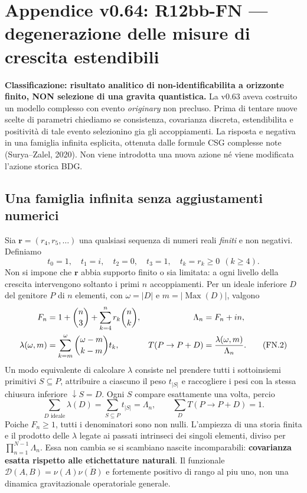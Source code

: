 \documentclass[11pt,a4paper]{article}
\begin{document}
\clearpage
\section*{Appendice v0.64: R12bb-FN --- degenerazione delle misure di crescita estendibili}
\label{sec:r12bbfn}
\textbf{Classificazione: risultato analitico di non-identificabilita a orizzonte finito, NON selezione di una gravita quantistica.}
La v0.63 aveva costruito un modello complesso con evento \emph{originary} non precluso. Prima di tentare nuove scelte di parametri chiediamo se consistenza, covarianza discreta, estendibilita e positività di tale evento selezionino gia gli accoppiamenti. La risposta e negativa in una famiglia infinita esplicita, ottenuta dalle formule CSG complesse note (Surya--Zalel, 2020). Non viene introdotta una nuova azione né viene modificata l'azione storica BDG.

\subsection*{Una famiglia infinita senza aggiustamenti numerici}
Sia $\boldsymbol r=(r_4,r_5,\ldots)$ una qualsiasi sequenza di numeri reali \emph{finiti} e non negativi. Definiamo
\begin{equation}
\boxed{t_0=1,\quad t_1=i,\quad t_2=0,\quad t_3=1,\quad t_k=r_k\ge0\ \ (k\ge4).}\tag{FN.1}
\end{equation}
Non si impone che $\boldsymbol r$ abbia supporto finito o sia limitata: a ogni livello della crescita intervengono soltanto i primi $n$ accoppiamenti. Per un ideale inferiore $D$ del genitore $P$ di $n$ elementi, con $\omega=|D|$ e $m=|\operatorname{Max}(D)|$, valgono
\begin{align}
F_n&=1+\binom n3+\sum_{k=4}^{n}r_k\binom nk, &\Lambda_n&=F_n+in,\notag\\
\lambda(\omega,m)&=\sum_{k=m}^{\omega}\binom{\omega-m}{k-m}t_k,
&T(P\to P+D)&=\frac{\lambda(\omega,m)}{\Lambda_n}.\tag{FN.2}
\end{align}
Un modo equivalente di calcolare $\lambda$ consiste nel prendere tutti i sottoinsiemi primitivi $S\subseteq P$, attribuire a ciascuno il peso $t_{|S|}$ e raccogliere i pesi con la stessa chiusura inferiore $\downarrow S=D$. Ogni $S$ compare esattamente una volta, percio
\begin{equation}
\boxed{\sum_{D\text{ ideale}}\lambda(D)=\sum_{S\subseteq P}t_{|S|}=\Lambda_n,\qquad
\sum_D T(P\to P+D)=1.}\tag{FN.3}
\end{equation}
Poiche $F_n\ge1$, tutti i denominatori sono non nulli. L'ampiezza di una storia finita e il prodotto delle $\lambda$ legate ai passati intrinseci dei singoli elementi, diviso per $\prod_{n=1}^{N-1}\Lambda_n$. Essa non cambia se si scambiano nascite incomparabili: \textbf{covarianza esatta rispetto alle etichettature naturali}. Il funzionale $\mathcal D(A,B)=\nu(A)\overline{\nu(B)}$ e fortemente positivo di rango al piu uno, non una dinamica gravitazionale operatoriale generale.
\end{document}
